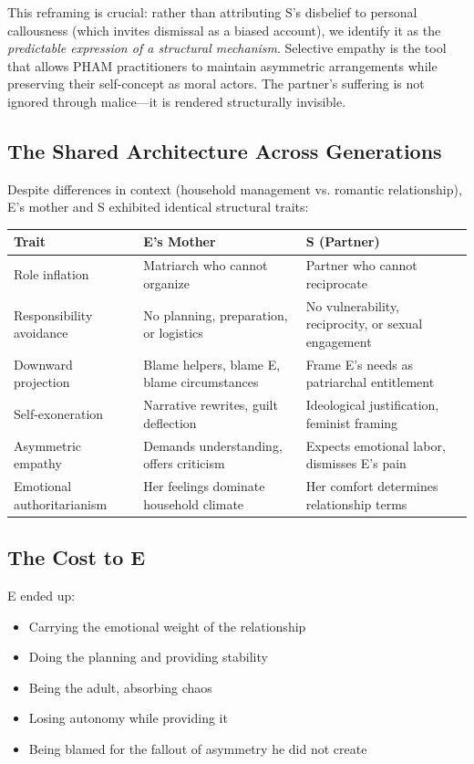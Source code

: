 \documentclass[12pt,openany]{book}
\numberwithin{equation}{chapter}
\begin{document}
This reframing is crucial: rather than attributing S's disbelief to personal callousness (which invites dismissal as a biased account), we identify it as the \textit{predictable expression of a structural mechanism}. Selective empathy is the tool that allows PHAM practitioners to maintain asymmetric arrangements while preserving their self-concept as moral actors. The partner's suffering is not ignored through malice---it is rendered structurally invisible.

\subsection{The Shared Architecture Across Generations}

Despite differences in context (household management vs. romantic relationship), E's mother and S exhibited identical structural traits:

\begin{center}
\begin{tabular}{|p{2in}|p{2in}|p{2in}|}
\hline
\textbf{Trait} & \textbf{E's Mother} & \textbf{S (Partner)} \\
\hline
Role inflation & Matriarch who cannot organize & Partner who cannot reciprocate \\
\hline
Responsibility avoidance & No planning, preparation, or logistics & No vulnerability, reciprocity, or sexual engagement \\
\hline
Downward projection & Blame helpers, blame E, blame circumstances & Frame E's needs as patriarchal entitlement \\
\hline
Self-exoneration & Narrative rewrites, guilt deflection & Ideological justification, feminist framing \\
\hline
Asymmetric empathy & Demands understanding, offers criticism & Expects emotional labor, dismisses E's pain \\
\hline
Emotional authoritarianism & Her feelings dominate household climate & Her comfort determines relationship terms \\
\hline
\end{tabular}
\end{center}

\subsection{The Cost to E}

E ended up:
\begin{itemize}
    \item Carrying the emotional weight of the relationship
    \item Doing the planning and providing stability
    \item Being the adult, absorbing chaos
    \item Losing autonomy while providing it
    \item Being blamed for the fallout of asymmetry he did not create
\end{itemize}
\end{document}
